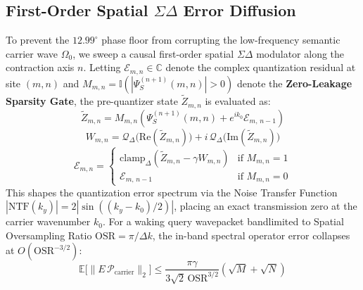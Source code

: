 \documentclass[10pt, twocolumn, a4paper]{article}
\begin{document}
\subsection{First-Order Spatial $\Sigma\Delta$ Error Diffusion}
To prevent the $12.99^\circ$ phase floor from corrupting the low-frequency semantic carrier wave $\Omega_0$, we sweep a causal first-order spatial $\Sigma\Delta$ modulator along the contraction axis $n$. Letting $\mathcal{E}_{m,n} \in \mathbb{C}$ denote the complex quantization residual at site $(m,n)$ and $M_{m,n} = \mathbb{I}(|\Psi_S^{(n+1)}(m,n)| > 0)$ denote the \textbf{Zero-Leakage Sparsity Gate}, the pre-quantizer state $\widetilde{Z}_{m,n}$ is evaluated as:
\begin{equation}
\widetilde{Z}_{m,n} = M_{m,n} \left( \Psi_S^{(n+1)}(m,n) + e^{i k_0} \mathcal{E}_{m, \, n-1} \right)
\end{equation}
\begin{equation}
W_{m,n} = \mathcal{Q}_{\Delta}\big(\text{Re}(\widetilde{Z}_{m,n})\big) + i \, \mathcal{Q}_{\Delta}\big(\text{Im}(\widetilde{Z}_{m,n})\big)
\end{equation}
\begin{equation}
\mathcal{E}_{m,n} = \begin{cases} \text{clamp}_{\Delta}\left(\widetilde{Z}_{m,n} - \gamma W_{m,n}\right) & \text{if } M_{m,n} = 1 \\ \mathcal{E}_{m, \, n-1} & \text{if } M_{m,n} = 0 \end{cases}
\end{equation}
This shapes the quantization error spectrum via the Noise Transfer Function $|\text{NTF}(k_y)| = 2|\sin((k_y - k_0)/2)|$, placing an exact transmission zero at the carrier wavenumber $k_0$. For a waking query wavepacket bandlimited to Spatial Oversampling Ratio $\text{OSR} = \pi / \Delta k$, the in-band spectral operator error collapses at $O(\text{OSR}^{-3/2})$:
\begin{equation}
\mathbb{E}\big[\|E \, \mathcal{P}_{\text{carrier}}\|_2\big] \le \frac{\pi \gamma}{3\sqrt{2} \, \text{OSR}^{3/2}} \left(\sqrt{M} + \sqrt{N}\right)
\end{equation}
\end{document}
